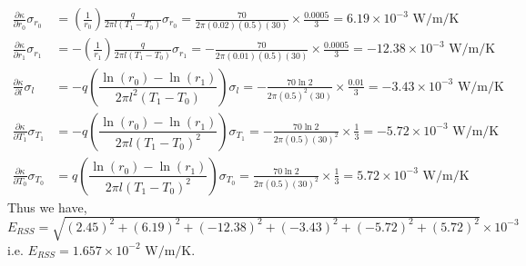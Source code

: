 \documentclass[a4paper, 11pt]{article}
\begin{document}
\begin{enumerate}[label=(\arabic*),leftmargin=*]
\begin{align*}
	\frac{\partial\kappa}{\partial r_0}\sigma_{r_0}&=\left(\frac{1}{r_0}\right)\frac{q}{2\pi l(T_1-T_0)}\sigma_{r_0}=\frac{70}{2\pi(0.02)(0.5)(30)}\times \frac{0.0005}{3}=6.19\times 10^{-3}\text{ W/m/K}\\
	\frac{\partial\kappa}{\partial r_1}\sigma_{r_1}&=-\left(\frac{1}{r_1}\right)\frac{q}{2\pi l(T_1-T_0)}\sigma_{r_1}=-\frac{70}{2\pi(0.01)(0.5)(30)}\times \frac{0.0005}{3}=-12.38\times 10^{-3}\text{ W/m/K}\\
	\frac{\partial\kappa}{\partial l}\sigma_{l}&=-q\left(\dfrac{\ln(r_0)-\ln(r_1)}{2\pi l^2(T_1-T_0)}\right)\sigma_{l}=-\frac{70\ln 2}{2\pi (0.5)^2(30)}\times \frac{0.01}{3}=-3.43\times 10^{-3}\text{ W/m/K}\\
	\frac{\partial\kappa}{\partial T_1}\sigma_{T_1}&=-q\left(\dfrac{\ln(r_0)-\ln(r_1)}{2\pi l(T_1-T_0)^2}\right)\sigma_{T_1}=-\frac{70\ln 2}{2\pi(0.5)(30)^2}\times \frac{1}{3}=-5.72\times 10^{-3}\text{ W/m/K}\\
	\frac{\partial\kappa}{\partial T_0}\sigma_{T_0}&=q\left(\dfrac{\ln(r_0)-\ln(r_1)}{2\pi l(T_1-T_0)^2}\right)\sigma_{T_0}=\frac{70\ln 2}{2\pi(0.5)(30)^2}\times \frac{1}{3}=5.72\times 10^{-3}\text{ W/m/K}
\end{align*}
Thus we have, $E_{RSS}=\sqrt{(2.45)^2+(6.19)^2+(-12.38)^2+(-3.43)^2+(-5.72)^2+(5.72)^2}\times 10^{-3}$ i.e. $\boxed{E_{RSS}=1.657\times 10^{-2}\text{ W/m/K}}$.


\end{enumerate}
\end{document}
